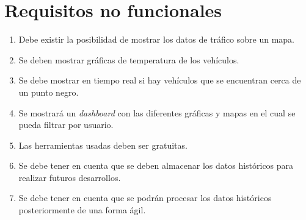 \section{Requisitos no funcionales\label{RNF}}

\begin{enumerate}
\item Debe existir la posibilidad de mostrar los datos de tráfico sobre un
  mapa.
\item Se deben mostrar gráficas de temperatura de los vehículos.
\item Se debe mostrar en tiempo real si hay vehículos que se encuentran
  cerca de un punto negro.
\item Se mostrará un {\em dashboard} con las diferentes gráficas y mapas 
  en el cual se pueda filtrar por usuario.
\item Las herramientas usadas deben ser gratuitas.
\item Se debe tener en cuenta que se deben almacenar los datos históricos
  para realizar futuros desarrollos.
\item Se debe tener en cuenta que se podrán procesar los datos históricos
  posteriormente de una forma ágil.
\end{enumerate}

